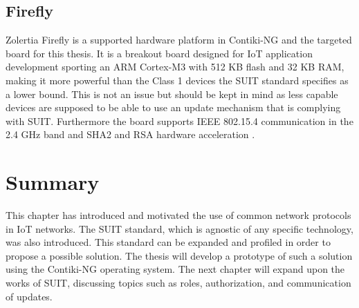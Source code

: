 \documentclass[0-thesis.tex]{subfiles}
\begin{document}
\subsection{Firefly}
\label{ssec:firefly}
Zolertia Firefly is a supported hardware platform in Contiki-NG and the targeted board for
this thesis. It is a breakout board designed for IoT application development sporting an
ARM Cortex-M3 with 512 KB flash and 32 KB RAM, making it more powerful than the Class 1
devices the SUIT standard specifies as a lower bound. This is not an issue but should be
kept in mind as less capable devices are supposed to be able to use an update mechanism
that is complying with SUIT. Furthermore the board supports IEEE 802.15.4 communication in
the 2.4 GHz band and SHA2 and RSA hardware acceleration \parencite{firefly-datasheet}.

\section{Summary}
\label{sec:2-summary}
This chapter has introduced and motivated the use of common network protocols in IoT
networks. The SUIT standard, which is agnostic of any specific technology, was also
introduced. This standard can be expanded and profiled in order to propose a possible
solution. The thesis will develop a prototype of such a solution using the Contiki-NG
operating system. The next chapter will expand upon the works of SUIT, discussing topics
such as roles, authorization, and communication of updates.
\end{document}
